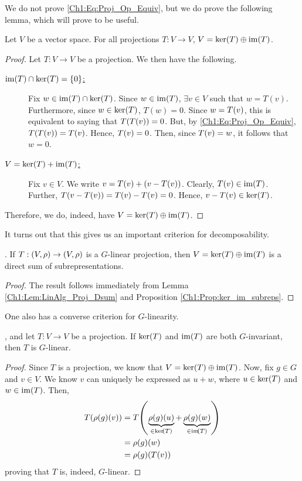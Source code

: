We do not prove \eqref{Ch1:Eq:Proj_Op_Equiv}, but we do prove the following lemma, which will prove to be useful.

\begin{lemma} \label{Ch1:Lem:LinAlg_Proj_Dsum}
    Let $V$ be a vector space. For all projections $T : V \to V$, $V = \operatorname{ker}\!\left( T \right) \oplus \operatorname{im}\!\left( T \right)$.
\end{lemma}
\begin{proof}
    Let $T : V \to V$ be a projection. We then have the following.
    \begin{description}
        \item[\underline{$\operatorname{im}\!\left( T \right) \cap \operatorname{ker}\!\left( T \right) = \left\{ 0 \right\}$:}] Fix $w \in \operatorname{im}\!\left( T \right) \cap \operatorname{ker}\!\left( T \right)$. Since $w \in \operatorname{im}\!\left( T \right)$, $\exists v \in V$ such that $w = T(v)$. Furthermore, since $w \in \operatorname{ker}\!\left( T \right)$, $T(w) = 0$. Since $w = T\!\left( v \right)$, this is equivalent to saying that $T\!\left( T\!\left( v \right) \right) = 0$. But, by \eqref{Ch1:Eq:Proj_Op_Equiv}, $T\!\left( T\!\left( v \right) \right) = T\!\left( v \right)$. Hence, $T\!\left( v \right) = 0$. Then, since $T\!\left( v \right) = w$, it follows that $w = 0$.
        \item[\underline{$V = \operatorname{ker}\!\left( T \right) + \operatorname{im}\!\left( T \right)$:}] Fix $v \in V$. We write $v = T\!\left( v \right) + \left( v - T\!\left( v \right) \right)$. Clearly, $T\!\left( v \right) \in \operatorname{im}\!\left( T \right)$. Further, $T\!\left( v - T\!\left( v \right) \right) = T\!\left( v \right) - T\!\left( v \right) = 0$. Hence, $v - T\!\left( v \right) \in \operatorname{ker}\!\left( T \right)$.
    \end{description}
    Therefore, we do, indeed, have $V = \operatorname{ker}\!\left( T \right) \oplus \operatorname{im}\!\left( T \right)$.
\end{proof}

It turns out that this gives us an important criterion for decomposability.

\begin{corollary}\label{Ch1:Cor:G_lin_proj_ker_im}
    . If $T : \left( V, \rho \right) \to \left( V, \rho \right)$ is a $G$-linear projection, then $V = \operatorname{ker}\!\left( T \right) \oplus \operatorname{im}\!\left( T \right)$ is a direct sum of subrepresentations.
\end{corollary}
\begin{proof}
    The result follows immediately from Lemma \ref{Ch1:Lem:LinAlg_Proj_Dsum} and Proposition \ref{Ch1:Prop:ker_im_subreps}.
\end{proof}

One also has a converse criterion for $G$-linearity.

\begin{proposition}\label{Ch1:Prop:Proj_Inv_Lin}
    , and let $T : V \to V$ be a projection. If $\operatorname{ker}\!\left( T \right)$ and $\operatorname{im}\!\left( T \right)$ are both $G$-invariant, then $T$ is $G$-linear.
\end{proposition}
\begin{proof}
    Since $T$ is a projection, we know that $V = \operatorname{ker}\!\left( T \right) \oplus \operatorname{im}\!\left( T \right)$. Now, fix $g \in G$ and $v \in V$. We know $v$ can uniquely be expressed as $u + w$, where $u \in \operatorname{ker}\!\left( T \right)$ and $w \in \operatorname{im}\!\left( T \right)$. Then,
    \begin{align*}
        T\!\left( \rho(g)(v) \right) &= T\!\left( \underbrace{\rho(g)(u)}_{\in \operatorname{ker}\!\left( T \right)} + \underbrace{\rho(g)(w)}_{\in \operatorname{im}\!\left( T \right)} \right) \\
        &= \rho(g)(w) \\
        &= \rho(g)\!\left( T\!\left( v \right) \right)
    \end{align*}
    proving that $T$ is, indeed, $G$-linear.
\end{proof}


